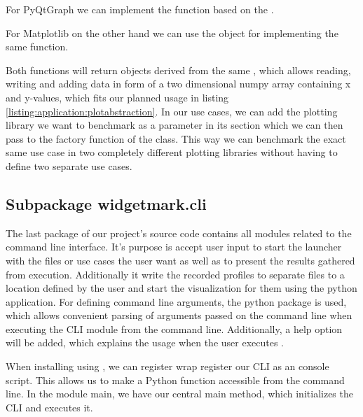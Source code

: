 For PyQtGraph we can implement the  function based
on the .



For Matplotlib on the other hand we can use the 
object for implementing the same function.



Both functions will return objects derived from the same
, which allows reading, writing and adding
data in form of a two dimensional numpy array containing x and y-values, which
fits our planned usage in listing \ref{listing:application:plotabstraction}. In
our use cases, we can add the plotting library we want to benchmark as a
parameter in its  section which we can then pass
to the factory function  of the
 class. This way we can benchmark the exact
same use case in two completely different plotting libraries without having to
define two separate use cases.

\subsection{Subpackage widgetmark.cli}

The last package of our project's source code contains all modules related to
the command line interface. It's purpose is accept user input to start the
launcher with the files or use cases the user want as well as to present the
results gathered from execution. Additionally it write the recorded profiles to
separate files to a location defined by the user and start the visualization for
them using the  python application. For defining
command line arguments, the python package  is
used, which allows convenient parsing of arguments passed on the command line
when executing the CLI module from the command line. Additionally, a help option
will be added, which explains the usage when the user executes
.

When installing  using
, we can register wrap register our CLI as an
console script. This allows us to make a Python function accessible from the
command line. In the module main, we have our central main method, which
initializes the CLI and executes it.

